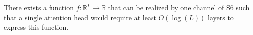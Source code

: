 
\setcounter{section}{1}
\begin{lemma}\label{lemma:dir2appendix}
There exists a function \( f : \mathbb{R}^L \rightarrow \mathbb{R} \) that can be realized by one channel of S6 such that a single attention head would require at least  \( O(\log(L)) \) layers to express this function.
\end{lemma}

